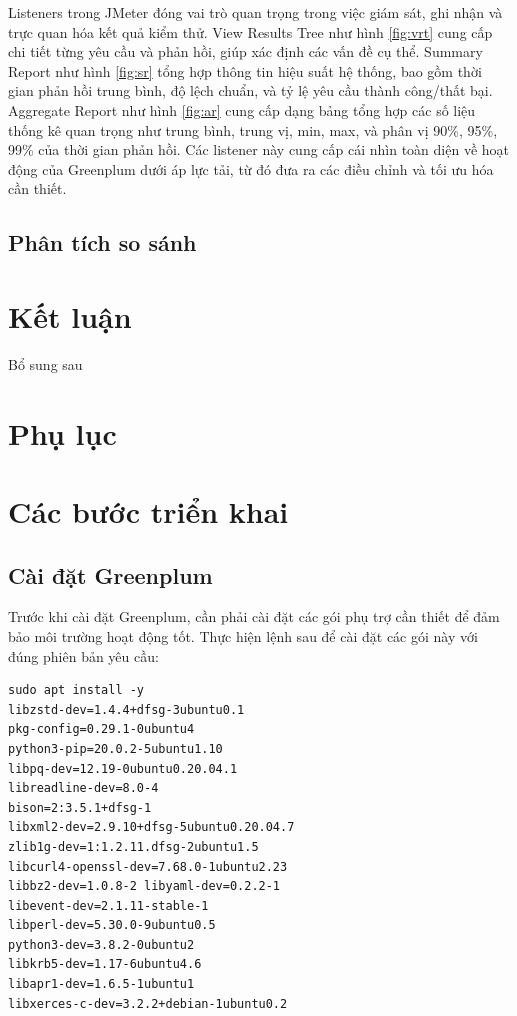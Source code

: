 \documentclass[14pt]{article}
\begin{document}
Listeners trong JMeter đóng vai trò quan trọng trong việc giám sát, ghi nhận và trực quan hóa kết quả kiểm thử. View Results Tree như hình \ref{fig:vrt} cung cấp chi tiết từng yêu cầu và phản hồi, giúp xác định các vấn đề cụ thể. Summary Report như hình \ref{fig:sr} tổng hợp thông tin hiệu suất hệ thống, bao gồm thời gian phản hồi trung bình, độ lệch chuẩn, và tỷ lệ yêu cầu thành công/thất bại. Aggregate Report như hình \ref{fig:ar} cung cấp dạng bảng tổng hợp các số liệu thống kê quan trọng như trung bình, trung vị, min, max, và phân vị 90\%, 95\%, 99\% của thời gian phản hồi. Các listener này cung cấp cái nhìn toàn diện về hoạt động của Greenplum dưới áp lực tải, từ đó đưa ra các điều chỉnh và tối ưu hóa cần thiết.

\subsection{Phân tích so sánh}






\section{Kết luận}
Bổ sung sau

\section{Phụ lục}
\appendix

\section{Các bước triển khai}




\subsection{Cài đặt Greenplum}

Trước khi cài đặt Greenplum, cần phải cài đặt các gói phụ trợ cần thiết để đảm bảo môi trường hoạt động tốt. Thực hiện lệnh sau để cài đặt các gói này với đúng phiên bản yêu cầu:
\begin{verbatim}
sudo apt install -y 
libzstd-dev=1.4.4+dfsg-3ubuntu0.1
pkg-config=0.29.1-0ubuntu4
python3-pip=20.0.2-5ubuntu1.10
libpq-dev=12.19-0ubuntu0.20.04.1
libreadline-dev=8.0-4
bison=2:3.5.1+dfsg-1
libxml2-dev=2.9.10+dfsg-5ubuntu0.20.04.7
zlib1g-dev=1:1.2.11.dfsg-2ubuntu1.5
libcurl4-openssl-dev=7.68.0-1ubuntu2.23
libbz2-dev=1.0.8-2 libyaml-dev=0.2.2-1
libevent-dev=2.1.11-stable-1
libperl-dev=5.30.0-9ubuntu0.5
python3-dev=3.8.2-0ubuntu2
libkrb5-dev=1.17-6ubuntu4.6
libapr1-dev=1.6.5-1ubuntu1
libxerces-c-dev=3.2.2+debian-1ubuntu0.2
\end{verbatim}
\end{document}
